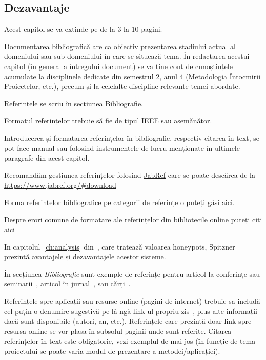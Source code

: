\subsection{Dezavantaje}\label{subsec:airqualityegg_dezavantaje}

{\color{blue}\noindent Acest capitol se va extinde pe de la 3 la 10 pagini.\\}

Documentarea bibliografică are ca obiectiv prezentarea stadiului actual al domeniului sau sub-domeniului în care se situează tema.
În redactarea acestui capitol (în general a întregului document) se va ține cont de cunoștințele acumulate la disciplinele dedicate din semestrul 2, anul 4
(Metodologia Întocmirii Proiectelor, etc.), precum și la celelalte discipline relevante temei abordate.


Referințele se scriu în secțiunea Bibliografie.

Formatul referințelor trebuie să fie de tipul IEEE sau asemănător.

Introducerea și formatarea referințelor în bibliografie, respectiv citarea în text, se pot face manual sau folosind instrumentele de lucru menționate în ultimele 
paragrafe din acest capitol.

Recomandăm gestiunea referințelor folosind \href{https://www.jabref.org/}{JabRef} care se poate descărca de la \url{https://www.jabref.org/#download}

Forma referințelor bibliografice pe categorii de referințe o puteți găsi \href{https://libguides.nps.edu/citation/ieee-bibtex}{aici}.

Despre erori comune de formatare ale referințelor din bibliotecile online puteți citi \href{https://www.ece.ucdavis.edu/~jowens/biberrors.html}{aici}


In capitolul~\ref{ch:analysis} din~\cite{strunk}, care tratează valoarea honeypots, Spitzner prezintă avantajele și dezavantajele acestor sisteme.


În secțiunea \textit{Bibliografie} sunt exemple de referințe pentru articol la conferințe sau seminarii~\cite{BellucciLZ04}, articol în jurnal~\cite{AntoniouSBDB07},
sau cărți~\cite{russell1995artificial}.


Referințele spre aplicații sau resurse online (pagini de internet) trebuie sa includă cel puțin o denumire sugestivă pe lâ ngă link-ul propriu-zis~\cite{webpage},
plus alte informații dacă sunt disponibile (autori, an, etc.).
Referințele care prezintă doar link spre resursa online se vor plasa în subsolul paginii unde sunt referite.
Citarea referințelor în text este obligatorie, vezi exemplul de mai jos (în funcție de tema proiectului se poate varia modul de prezentare a metodei/aplicației).

